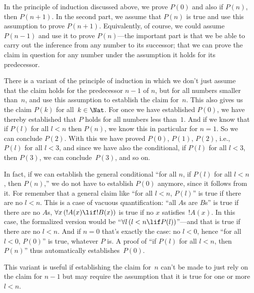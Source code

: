 \documentclass[../../../include/open-logic-section]{subfiles}
\begin{document}


In the principle of induction discussed above, we prove $P(0)$ and
also if $P(n)$, then $P(n+1)$.  In the second part, we assume that
$P(n)$ is true and use this assumption to prove $P(n+1)$.
Equivalently, of course, we could assume $P(n-1)$ and use it to prove
$P(n)$---the important part is that we be able to carry out the
inference from any number to its successor; that we can prove the
claim in question for any number under the assumption it holds for its
predecessor.

There is a variant of the principle of induction in which we don't
just assume that the claim holds for the predecessor $n-1$ of $n$, but
for all numbers smaller than~$n$, and use this assumption to establish
the claim for~$n$. This also gives us the claim $P(k)$ for all~$k \in
\Nat$.  For once we have established $P(0)$, we have thereby
established that $P$ holds for all numbers less than~$1$.  And if we
know that if $P(l)$ for all $l<n$ then $P(n)$, we know this in
particular for $n=1$.  So we can conclude $P(2)$.  With this we have
proved $P(0)$, $P(1)$, $P(2)$, i.e., $P(l)$ for all $l<3$, and since
we have also the conditional, if $P(l)$ for all $l<3$, then $P(3)$, we
can conclude~$P(3)$, and so on.

In fact, if we can establish the general conditional ``for all $n$, if
$P(l)$ for all $l<n$, then $P(n)$,'' we do not have to establish
$P(0)$ anymore, since it follows from it.  For remember that a general
claim like ``for all $l<n$, $P(l)$'' is true if there are no $l<n$.
This is a case of vacuous quantification: ``all $A$s are $B$s'' is
true if there are no $A$s, $\lforall[x][(!A(x) \lif !B(x))]$ is true
if no $x$ satisfies~$!A(x)$. In this case, the formalized version
would be ``$\lforall[l][(l < n \lif P(l))]$''---and that is true if
there are no $l < n$.  And if $n=0$ that's exactly the case: no $l<0$,
hence ``for all $l<0$, $P(0)$'' is true, whatever $P$ is.  A proof of
``if $P(l)$ for all $l<n$, then $P(n)$'' thus automatically
establishes~$P(0)$.

This variant is useful if establishing the claim for~$n$ can't be made
to just rely on the claim for $n-1$ but may require the assumption
that it is true for one or more $l<n$.  
\end{document}
